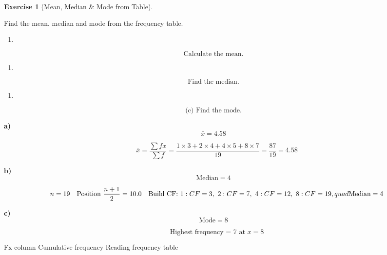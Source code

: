 \documentclass[
  letterpaper,
  DIV=11,
  numbers=noendperiod]{scrreprt}
\providecommand{\tightlist}{%
  \setlength{\itemsep}{0pt}\setlength{\parskip}{0pt}}
\theoremstyle{definition}
\newtheorem{exercise}{Exercise}[chapter]
\theoremstyle{remark}
\begin{document}
\begin{exercise}[Mean, Median \& Mode from
Table]\protect\hypertarget{exr-freq-4}{}\label{exr-freq-4}

Find the mean, median and mode from the frequency table.

\begin{enumerate}
\def\labelenumi{\alph{enumi})}
\tightlist
\item
\end{enumerate}

\[\text{Calculate the mean.}\]

\begin{enumerate}
\def\labelenumi{\alph{enumi})}
\setcounter{enumi}{1}
\tightlist
\item
\end{enumerate}

\[\text{Find the median.}\]

\begin{enumerate}
\def\labelenumi{\alph{enumi})}
\setcounter{enumi}{2}
\tightlist
\item
\end{enumerate}

\[\text{(c) Find the mode.}\]

\begin{tcolorbox}[enhanced jigsaw, opacitybacktitle=0.6, coltitle=black, arc=.35mm, colframe=quarto-callout-tip-color-frame, colback=white, bottomrule=.15mm, left=2mm, colbacktitle=quarto-callout-tip-color!10!white, titlerule=0mm, opacityback=0, title=\textcolor{quarto-callout-tip-color}{\faLightbulb}\hspace{0.5em}{🔍 View Solution}, leftrule=.75mm, breakable, rightrule=.15mm, bottomtitle=1mm, toptitle=1mm, toprule=.15mm]

\textbf{a)} \[\bar{x} = 4.58\]

\[\quad \bar{x}=\dfrac{\sum fx}{\sum f}=\dfrac{1\times3+2\times4+4\times5+8\times7}{19}=\dfrac{87}{19}=4.58\]

\textbf{b)} \[\text{Median} = 4\]

\[\quad n=19\quad \text{Position }\frac{n+1}{2}=10.0\quad \text{Build CF: }1: CF=3,\ 2: CF=7,\ 4: CF=12,\ 8: CF=19,\\quad \text{Median}=4\]

\textbf{c)} \[\text{Mode} = 8\]

\[\quad \text{Highest frequency = }7\text{ at }x=8\]

\end{tcolorbox}

{Fx column} {Cumulative frequency} {Reading frequency table}

\end{exercise}
\end{document}
